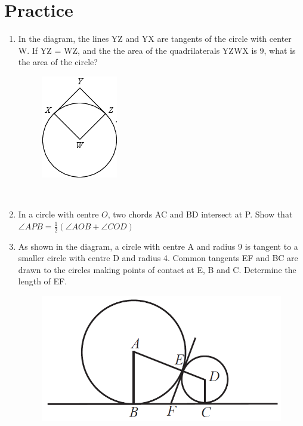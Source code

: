 \documentclass[12pt]{article}
\begin{document}
\section{Practice}
	\begin{enumerate}
		\item In the diagram, the lines YZ and YX are tangents of the circle with center W. If YZ = WZ, and the the area of the quadrilaterals YZWX is 9, what is the area of the circle?  
		\begin{figure}[h!]
			\centering
			\includegraphics[height=0.2\textheight]{Graphics/Week_13/Questions/Q2.png}
		\end{figure}\\ 
	    
	    \item In a circle with centre $O$, two chords AC and BD intersect at P. Show that $\angle APB =\frac{1}{2}(\angle AOB + \angle COD)$ \spacing
	    
	    \item As shown in the diagram, a circle with centre A and radius 9 is tangent to a smaller circle with centre D and radius 4. Common tangents EF and BC are drawn to the circles making points of contact at E, B and C. Determine the length of EF.
	    \begin{figure}[h!]
	    	\centering
	    	\includegraphics[height=0.2\textheight]{Graphics/Week_13/Questions/Q1.png}
	    \end{figure}
	\end{enumerate}
\end{document}
